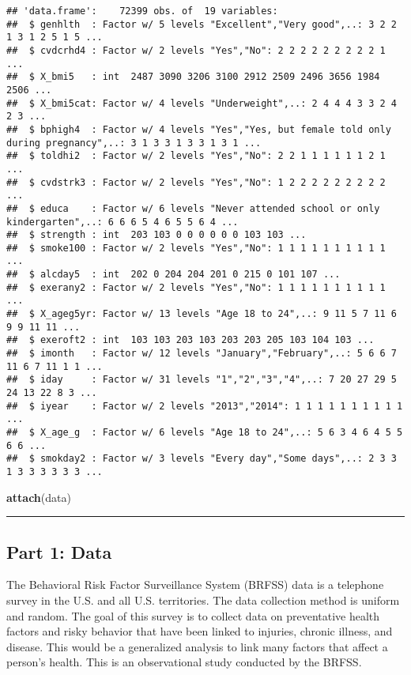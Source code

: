 \documentclass[
]{article}
\newenvironment{Shaded}{\begin{snugshade}}{\end{snugshade}}
\newcommand{\KeywordTok}[1]{\textcolor[rgb]{0.13,0.29,0.53}{\textbf{#1}}}
\newcommand{\NormalTok}[1]{#1}
\begin{document}
\begin{verbatim}
## 'data.frame':    72399 obs. of  19 variables:
##  $ genhlth  : Factor w/ 5 levels "Excellent","Very good",..: 3 2 2 1 3 1 2 5 1 5 ...
##  $ cvdcrhd4 : Factor w/ 2 levels "Yes","No": 2 2 2 2 2 2 2 2 2 1 ...
##  $ X_bmi5   : int  2487 3090 3206 3100 2912 2509 2496 3656 1984 2506 ...
##  $ X_bmi5cat: Factor w/ 4 levels "Underweight",..: 2 4 4 4 3 3 2 4 2 3 ...
##  $ bphigh4  : Factor w/ 4 levels "Yes","Yes, but female told only during pregnancy",..: 3 1 3 3 1 3 3 1 3 1 ...
##  $ toldhi2  : Factor w/ 2 levels "Yes","No": 2 2 1 1 1 1 1 1 2 1 ...
##  $ cvdstrk3 : Factor w/ 2 levels "Yes","No": 1 2 2 2 2 2 2 2 2 2 ...
##  $ educa    : Factor w/ 6 levels "Never attended school or only kindergarten",..: 6 6 6 5 4 6 5 5 6 4 ...
##  $ strength : int  203 103 0 0 0 0 0 0 103 103 ...
##  $ smoke100 : Factor w/ 2 levels "Yes","No": 1 1 1 1 1 1 1 1 1 1 ...
##  $ alcday5  : int  202 0 204 204 201 0 215 0 101 107 ...
##  $ exerany2 : Factor w/ 2 levels "Yes","No": 1 1 1 1 1 1 1 1 1 1 ...
##  $ X_ageg5yr: Factor w/ 13 levels "Age 18 to 24",..: 9 11 5 7 11 6 9 9 11 11 ...
##  $ exeroft2 : int  103 103 203 103 203 203 205 103 104 103 ...
##  $ imonth   : Factor w/ 12 levels "January","February",..: 5 6 6 7 11 6 7 11 1 1 ...
##  $ iday     : Factor w/ 31 levels "1","2","3","4",..: 7 20 27 29 5 24 13 22 8 3 ...
##  $ iyear    : Factor w/ 2 levels "2013","2014": 1 1 1 1 1 1 1 1 1 1 ...
##  $ X_age_g  : Factor w/ 6 levels "Age 18 to 24",..: 5 6 3 4 6 4 5 5 6 6 ...
##  $ smokday2 : Factor w/ 3 levels "Every day","Some days",..: 2 3 3 1 3 3 3 3 3 3 ...
\end{verbatim}

\begin{Shaded}
\begin{Highlighting}[]
\KeywordTok{attach}\NormalTok{(data)}
\end{Highlighting}
\end{Shaded}

\begin{center}\rule{0.5\linewidth}{0.5pt}\end{center}

\hypertarget{part-1-data}{%
\subsection{Part 1: Data}\label{part-1-data}}

The Behavioral Risk Factor Surveillance System (BRFSS) data is a
telephone survey in the U.S. and all U.S. territories. The data
collection method is uniform and random. The goal of this survey is to
collect data on preventative health factors and risky behavior that have
been linked to injuries, chronic illness, and disease. This would be a
generalized analysis to link many factors that affect a person's health.
This is an observational study conducted by the BRFSS.
\end{document}
